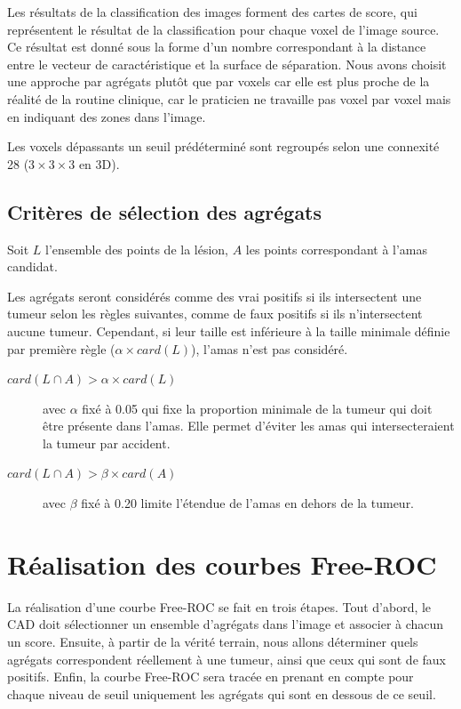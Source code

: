 Les résultats de la classification des images forment des cartes de score, qui représentent le résultat de la classification pour chaque voxel de l'image source. Ce résultat est donné sous la forme d'un nombre correspondant à la distance entre le vecteur de caractéristique et la surface de séparation. Nous avons choisit une approche par agrégats plutôt que par voxels car elle est plus proche de la réalité de la routine clinique, car le praticien ne travaille pas voxel par voxel mais en indiquant des zones dans l'image.

Les voxels dépassants un seuil prédéterminé sont regroupés selon une connexité 28 ($3\times3\times3$ en 3D). 


\subsection{Critères de sélection des agrégats}

Soit $L$ l'ensemble des points de la lésion, $A$ les points correspondant à l'amas candidat.

Les agrégats seront considérés comme des vrai positifs si ils intersectent une tumeur selon les règles suivantes, comme de faux positifs si ils n'intersectent aucune tumeur. Cependant, si leur taille est inférieure à la taille minimale définie par première règle ($\alpha \times card( L )$), l'amas n'est pas considéré.


\begin{description}
 \item[$card( L \cap A ) > \alpha \times card( L )$] avec $\alpha$ fixé à 0.05 qui fixe la proportion minimale de la tumeur qui doit être présente dans l'amas. Elle permet d'éviter les amas qui intersecteraient la tumeur par accident.
 \item[$card( L \cap A ) > \beta \times card( A )$]  avec $\beta$ fixé à 0.20 limite l'étendue de l'amas en dehors de la tumeur.
\end{description}

\section{Réalisation des courbes Free-ROC}

La réalisation d'une courbe Free-ROC se fait en trois étapes. Tout d'abord, le CAD doit sélectionner un ensemble d'agrégats dans l'image et associer à chacun un score. Ensuite, à partir de la vérité terrain, nous allons déterminer quels agrégats correspondent réellement à une tumeur, ainsi que ceux qui sont de faux positifs. Enfin, la courbe Free-ROC sera tracée en prenant en compte pour chaque niveau de seuil uniquement les agrégats qui sont en dessous de ce seuil.

